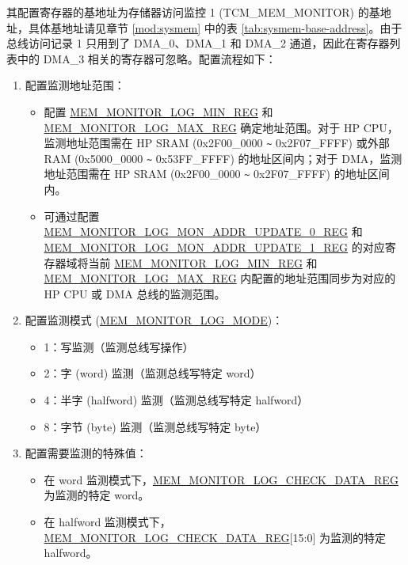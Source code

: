 \documentclass[main\_\_CN.tex]{subfiles}
\begin{document}
其配置寄存器的基地址为存储器访问监控 1 (TCM\_MEM\_MONITOR) 的基地址，具体基地址请见章节 \ref{mod:sysmem} \textit{} 中的表 \ref{tab:sysmem-base-address}。由于总线访问记录 1 只用到了 DMA\_0、DMA\_1 和 DMA\_2 通道，因此在寄存器列表中的 DMA\_3 相关的寄存器可忽略。配置流程如下：

\begin{enumerate}
    \item 配置监测地址范围：
        \begin{itemize}
            \item 配置 \hyperref[regdesc:MEMMONITORLOGMINREG]{MEM\_MONITOR\_LOG\_MIN\_REG} 和 \hyperref[regdesc:MEMMONITORLOGMAXREG]{MEM\_MONITOR\_LOG\_MAX\_REG} 确定地址范围。对于 HP CPU，监测地址范围需在 HP SRAM (0x2F00\_0000 \verb+~+ 0x2F07\_FFFF) 或外部 RAM (0x5000\_0000 \verb+~+ 0x53FF\_FFFF) 的地址区间内；对于 DMA，监测地址范围需在 HP SRAM (0x2F00\_0000 \verb+~+ 0x2F07\_FFFF) 的地址区间内。
            \item 可通过配置 \hyperref[regdesc:MEMMONITORLOGMONADDRUPDATE0REG]{MEM\_MONITOR\_LOG\_MON\_ADDR\_UPDATE\_0\_REG} 和 \hyperref[regdesc:MEMMONITORLOGMONADDRUPDATE1REG]{MEM\_MONITOR\_LOG\_MON\_ADDR\_UPDATE\_1\_REG} 的对应寄存器域将当前 \hyperref[regdesc:MEMMONITORLOGMINREG]{MEM\_MONITOR\_LOG\_MIN\_REG} 和 \hyperref[regdesc:MEMMONITORLOGMAXREG]{MEM\_MONITOR\_LOG\_MAX\_REG} 内配置的地址范围同步为对应的 HP CPU 或  DMA 总线的监测范围。
        \end{itemize}
    \item 配置监测模式 (\hyperref[fielddesc:MEMMONITORLOGMODE]{MEM\_MONITOR\_LOG\_MODE})：
        \begin{itemize}
            \item 1：写监测（监测总线写操作）
            \item 2：字 (word) 监测（监测总线写特定 word）
            \item 4：半字 (halfword) 监测（监测总线写特定 halfword）
            \item 8：字节 (byte) 监测（监测总线写特定 byte）
        \end{itemize}
    \item 配置需要监测的特殊值：
        \begin{itemize}
            \item 在 word 监测模式下，\hyperref[regdesc:MEMMONITORLOGCHECKDATAREG]{MEM\_MONITOR\_LOG\_CHECK\_DATA\_REG} 为监测的特定 word。
            \item 在 halfword 监测模式下，\hyperref[regdesc:MEMMONITORLOGCHECKDATAREG]{MEM\_MONITOR\_LOG\_CHECK\_DATA\_REG}[15:0] 为监测的特定 halfword。

\end{itemize}
\end{enumerate}
\end{document}
